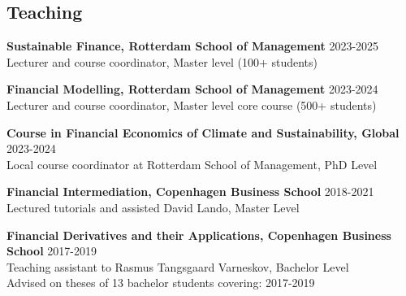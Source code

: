 \documentclass[11pt]{res} %
\newcommand{\fullhrulefill}{%
  \vspace{-1ex}%
  \hspace*{-\sectionwidth}\hrulefill%
  }
\begin{document}
\begin{resume}
\vspace{0.2in} %


\section{Teaching} 
\fullhrulefill \newline
{\bf Sustainable Finance, Rotterdam School of Management}  \hfill 2023-2025 \\%
Lecturer and course coordinator, Master level (100+ students)  %

{\bf Financial Modelling, Rotterdam School of Management} \hfill 2023-2024 \\%
Lecturer and course coordinator, Master level core course (500+ students)  %

{\bf Course in Financial Economics of Climate and Sustainability, Global} \hfill 2023-2024 \\%
Local course coordinator at Rotterdam School of Management, PhD Level


{\bf Financial Intermediation, Copenhagen Business School} \hfill 2018-2021  \\%
Lectured tutorials and assisted David Lando, Master Level 

{\bf Financial Derivatives and their Applications, Copenhagen Business School} \hfill 2017-2019 \\%
Teaching assistant to Rasmus Tangsgaard Varneskov, Bachelor Level  \iffalse \\
Advised on theses of 13 bachelor students covering: \hfill 2017-2019 


\end{resume}
\end{document}
